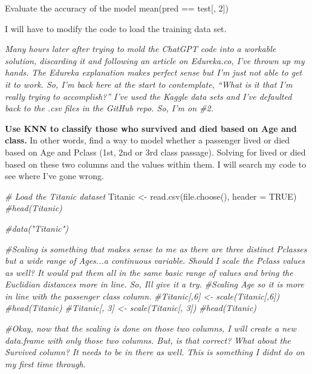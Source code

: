 \documentclass[
  ignorenonframetext,
]{beamer}
\newenvironment{Shaded}{\begin{snugshade}}{\end{snugshade}}
\newcommand{\AttributeTok}[1]{\textcolor[rgb]{0.77,0.63,0.00}{#1}}
\newcommand{\CommentTok}[1]{\textcolor[rgb]{0.56,0.35,0.01}{\textit{#1}}}
\newcommand{\ConstantTok}[1]{\textcolor[rgb]{0.00,0.00,0.00}{#1}}
\newcommand{\FunctionTok}[1]{\textcolor[rgb]{0.00,0.00,0.00}{#1}}
\newcommand{\NormalTok}[1]{#1}
\newcommand{\OtherTok}[1]{\textcolor[rgb]{0.56,0.35,0.01}{#1}}
\begin{document}
\begin{frame}[fragile]{Evaluate the accuracy of the model}
\protect\hypertarget{evaluate-the-accuracy-of-the-model}{}
mean(pred == test{[}, 2{]})

I will have to modify the code to load the training data set.

\emph{Many hours later after trying to mold the ChatGPT code into a
workable solution, discarding it and following an article on Edureka.co,
I've thrown up my hands. The Edureka explanation makes perfect sense but
I'm just not able to get it to work. So, I'm back here at the start to
contemplate, ``What is it that I'm really trying to accomplish?'' I've
used the Kaggle data sets and I've defaulted back to the .csv files in
the GitHub repo. So, I'm on \#2.}

\textbf{Use KNN to classify those who survived and died based on Age and
class.} In other words, find a way to model whether a passenger lived or
died based on Age and Pclass (1st, 2nd or 3rd class passage). Solving
for lived or died based on these two columns and the values within them.
I will search my code to see where I've gone wrong.

\begin{Shaded}
\begin{Highlighting}[]
\CommentTok{\# Load the Titanic dataset}
\NormalTok{Titanic }\OtherTok{\textless{}{-}} \FunctionTok{read.csv}\NormalTok{(}\FunctionTok{file.choose}\NormalTok{(), }\AttributeTok{header =} \ConstantTok{TRUE}\NormalTok{)}
\CommentTok{\#head(Titanic)}

\CommentTok{\#data("Titanic")}

\CommentTok{\#Scaling is something that makes sense to me as there are three distinct Pclasses but a wide range of Ages...a continuous variable.  Should I scale the Pclass values as well?  It would put them all in the same basic range of values and bring the Euclidian distances more in line.  So, I\textquotesingle{}ll give it a try.  }
\CommentTok{\#Scaling Age so it is more in line with the passenger class column.  }
\CommentTok{\#Titanic[,6] \textless{}{-} scale(Titanic[,6])}
\CommentTok{\#head(Titanic)}
\CommentTok{\#Titanic[, 3] \textless{}{-} scale(Titanic[, 3])}
\CommentTok{\#head(Titanic)}

\CommentTok{\#Okay, now that the scaling is done on those two columns, I will create a new data.frame with only those two columns.  But, is that correct?  What about the Survived column?  It needs to be in there as well.  This is something I didn\textquotesingle{}t do on my first time through. }


\end{Highlighting}
\end{Shaded}
\end{frame}
\end{document}
